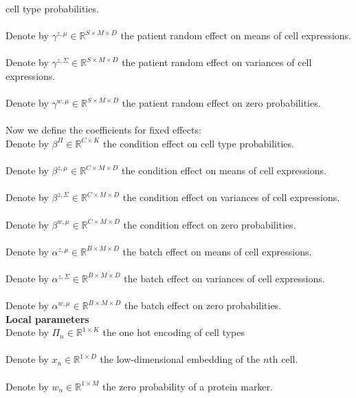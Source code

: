 \documentclass[a4paper]{article}
\begin{document}
cell type probabilities. \\~\\
Denote by $\gamma^{z,\mu} \in \mathbb{R}^{S \times M \times D}$ the patient random effect 
on means of cell expressions. \\~\\
Denote by $\gamma^{z,\Sigma} \in \mathbb{R}^{S \times M \times D}$ the patient random effect 
on variances of cell expressions. \\~\\
Denote by $\gamma^{w,\mu} \in \mathbb{R}^{S \times M \times D}$ the patient random effect 
on zero probabilities. \\~\\
Now we define the coefficients for fixed effects:\\
Denote by $\beta^\Pi \in \mathbb{R}^{C\times K}$ the condition effect on 
cell type probabilities. \\~\\
Denote by $\beta^{z,\mu} \in \mathbb{R}^{C \times M \times D}$ the condition effect 
on means of cell expressions. \\~\\
Denote by $\beta^{z,\Sigma} \in \mathbb{R}^{C \times M \times D}$ the condition effect 
on variances of cell expressions. \\~\\
Denote by $\beta^{w,\mu} \in \mathbb{R}^{C \times M \times D}$ the condition effect 
on zero probabilities. \\~\\
Denote by $\alpha^{z,\mu} \in \mathbb{R}^{B \times M \times D}$ the batch effect 
on means of cell expressions. \\~\\
Denote by $\alpha^{z,\Sigma} \in \mathbb{R}^{B \times M \times D}$ the batch effect 
on variances of cell expressions. \\~\\
Denote by $\alpha^{w,\mu} \in \mathbb{R}^{B \times M \times D}$ the batch effect 
on zero probabilities. \\
\textbf{Local parameters}\\
Denote by $\Pi_n \in \mathbb{R}^{1 \times K}$ the one hot encoding of cell types\\~\\
Denote by $x_n \in \mathbb{R}^{1 \times D}$ the low-dimensional embedding of the $n$th cell.\\~\\
Denote by $w_n \in \mathbb{R}^{1 \times M}$ the zero probability of a protein marker.\\~\\
\end{document}
